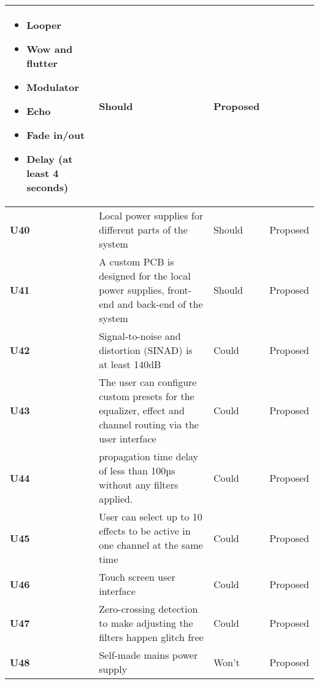 \begin{longtable}{|l|p{10cm}|l|l|}
\begin{itemize}
		\item Looper
		\item Wow and flutter
		\item Modulator
		\item Echo
		\item Fade in/out
		\item Delay (at least 4 seconds)
	\end{itemize}																												& Should & Proposed\\ \hline
	\textbf{U40} &Local power supplies for different parts of the system 														& Should & Proposed\\ \hline
	\textbf{U41} &A custom PCB is designed for the local power supplies, front-end and back-end of the system					& Should & Proposed\\ \hline
	\textbf{U42} &Signal-to-noise and distortion (SINAD) is at least 140dB 														& Could  & Proposed\\ \hline
	\textbf{U43} &The user can configure custom presets for the equalizer, effect and channel routing via the user interface	& Could  & Proposed\\ \hline
	\textbf{U44} &propagation time delay of less than 100µs without any filters applied. 										& Could  & Proposed\\ \hline
	\textbf{U45} &User can select up to 10 effects to be active in one channel at the same time 								& Could  & Proposed\\ \hline
	\textbf{U46} &Touch screen user interface 																					& Could  & Proposed\\ \hline
	\textbf{U47} &Zero-crossing detection to make adjusting the filters happen glitch free										& Could  & Proposed\\ \hline
	\textbf{U48} &Self-made mains power supply  																				& Won't  & Proposed\\ \hline
\end{longtable}